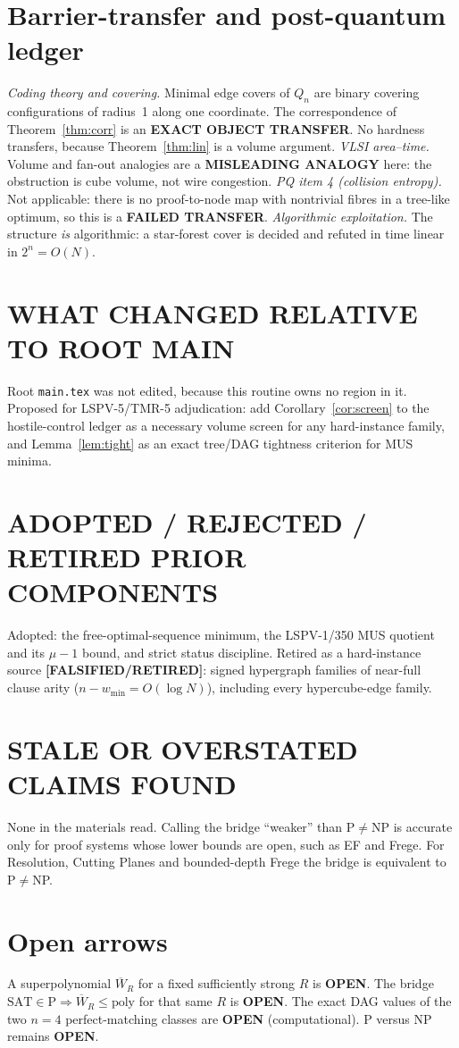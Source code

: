 \documentclass[11pt]{article}
\theoremstyle{remark}
\newcommand{\status}[1]{\textbf{[#1]}}
\newcommand{\Wb}{\overline W}
\begin{document}
\section{Barrier-transfer and post-quantum ledger}
\emph{Coding theory and covering.} Minimal edge covers of $Q_n$ are binary covering configurations of
radius~1 along one coordinate. The correspondence of Theorem~\ref{thm:corr} is an \textbf{EXACT
OBJECT TRANSFER}. No hardness transfers, because Theorem~\ref{thm:lin} is a volume argument.
\emph{VLSI area--time.} Volume and fan-out analogies are a \textbf{MISLEADING ANALOGY} here: the
obstruction is cube volume, not wire congestion. \emph{PQ item 4 (collision entropy).} Not
applicable: there is no proof-to-node map with nontrivial fibres in a tree-like optimum, so this is a
\textbf{FAILED TRANSFER}. \emph{Algorithmic exploitation.} The structure \emph{is} algorithmic: a
star-forest cover is decided and refuted in time linear in $2^n=O(N)$.

\section{WHAT CHANGED RELATIVE TO ROOT MAIN}
Root \texttt{main.tex} was not edited, because this routine owns no region in it. Proposed for
LSPV-5/TMR-5 adjudication: add Corollary~\ref{cor:screen} to the hostile-control ledger as a
necessary volume screen for any hard-instance family, and Lemma~\ref{lem:tight} as an exact
tree/DAG tightness criterion for MUS minima.

\section{ADOPTED / REJECTED / RETIRED PRIOR COMPONENTS}
Adopted: the free-optimal-sequence minimum, the LSPV-1/350 MUS quotient and its $\mu-1$ bound, and
strict status discipline. Retired as a hard-instance source \status{FALSIFIED/RETIRED}: signed
hypergraph families of near-full clause arity ($n-w_{\min}=O(\log N)$), including every
hypercube-edge family.

\section{STALE OR OVERSTATED CLAIMS FOUND}
None in the materials read. Calling the bridge ``weaker'' than P$\ne$NP is accurate only for proof
systems whose lower bounds are open, such as EF and Frege. For Resolution, Cutting Planes and
bounded-depth Frege the bridge is equivalent to P$\ne$NP.

\section{Open arrows}
A superpolynomial $\Wb_R$ for a fixed sufficiently strong $R$ is \textbf{OPEN}. The bridge
$\mathrm{SAT}\in\mathrm P\Rightarrow\Wb_R\le\mathrm{poly}$ for that same $R$ is \textbf{OPEN}. The
exact DAG values of the two $n=4$ perfect-matching classes are \textbf{OPEN} (computational).
P versus NP remains \textbf{OPEN}.
\end{document}
